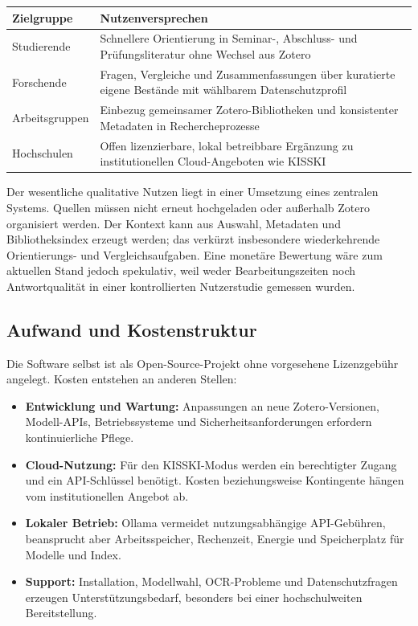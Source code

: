 \documentclass[11pt,a4paper,oneside,parskip=half]{scrartcl}
\begin{document}
\noindent\begin{tabularx}{\linewidth}{@{}L{3.5cm}Y@{}}
\toprule
\textbf{Zielgruppe} & \textbf{Nutzenversprechen} \\
\midrule
Studierende & Schnellere Orientierung in Seminar-, Abschluss- und
  Prüfungsliteratur ohne Wechsel aus Zotero \\
Forschende & Fragen, Vergleiche und Zusammenfassungen über kuratierte eigene
  Bestände mit wählbarem Datenschutzprofil \\
Arbeitsgruppen & Einbezug gemeinsamer Zotero-Bibliotheken und konsistenter
  Metadaten in Rechercheprozesse \\
Hochschulen & Offen lizenzierbare, lokal betreibbare Ergänzung zu
  institutionellen Cloud-Angeboten wie KISSKI \\
\bottomrule
\end{tabularx}

Der wesentliche qualitative Nutzen liegt in einer Umsetzung eines zentralen Systems.
Quellen müssen nicht erneut hochgeladen oder außerhalb Zotero organisiert
werden. Der Kontext kann aus Auswahl, Metadaten und Bibliotheksindex erzeugt
werden; das verkürzt insbesondere wiederkehrende Orientierungs- und
Vergleichsaufgaben. Eine monetäre Bewertung wäre zum aktuellen Stand jedoch
spekulativ, weil weder Bearbeitungszeiten noch Antwortqualität in einer
kontrollierten Nutzerstudie gemessen wurden.

\subsection{Aufwand und Kostenstruktur}

Die Software selbst ist als Open-Source-Projekt ohne vorgesehene Lizenzgebühr
angelegt. Kosten entstehen an anderen Stellen:
\begin{itemize}
  \item \textbf{Entwicklung und Wartung:} Anpassungen an neue Zotero-Versionen,
    Modell-APIs, Betriebssysteme und Sicherheitsanforderungen erfordern
    kontinuierliche Pflege.
  \item \textbf{Cloud-Nutzung:} Für den KISSKI-Modus werden ein berechtigter
    Zugang und ein API-Schlüssel benötigt. Kosten beziehungsweise Kontingente
    hängen vom institutionellen Angebot ab.
  \item \textbf{Lokaler Betrieb:} Ollama vermeidet nutzungsabhängige
    API-Gebühren, beansprucht aber Arbeitsspeicher, Rechenzeit, Energie und
    Speicherplatz für Modelle und Index.
  \item \textbf{Support:} Installation, Modellwahl, OCR-Probleme und
    Datenschutzfragen erzeugen Unterstützungsbedarf, besonders bei einer
    hochschulweiten Bereitstellung.
\end{itemize}
\end{document}
